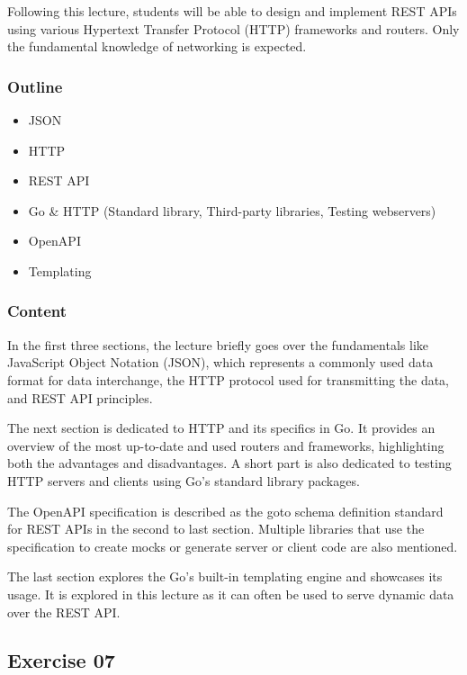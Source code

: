 \documentclass[
  digital,
  color,
  oneside,
  nosansbold,
  nocolorbold,
  nolof,
  nolot,
]{fithesis4}
\begin{document}
Following this lecture, students will be able to design and implement REST APIs using various Hypertext Transfer Protocol (HTTP) frameworks and routers. Only the fundamental knowledge of networking is expected.

\subsubsection{Outline}

\begin{itemize}
    \item JSON
    \item HTTP
    \item REST API
    \item Go \& HTTP (Standard library, Third-party libraries, Testing webservers)
    \item OpenAPI
    \item Templating
\end{itemize}

\subsubsection{Content}

In the first three sections, the lecture briefly goes over the fundamentals like JavaScript Object Notation (JSON), which represents a commonly used data format for data interchange, the HTTP protocol used for transmitting the data, and REST API principles.

The next section is dedicated to HTTP and its specifics in Go. It provides an overview of the most up-to-date and used routers and frameworks, highlighting both the advantages and disadvantages. A short part is also dedicated to testing HTTP servers and clients using Go's standard library packages.

The OpenAPI specification is described as the goto schema definition standard for REST APIs in the second to last section. Multiple libraries that use the specification to create mocks or generate server or client code are also mentioned.

The last section explores the Go's built-in templating engine and showcases its usage. It is explored in this lecture as it can often be used to serve dynamic data over the REST API.

\subsection{Exercise 07}\label{exercise-07}
\end{document}

